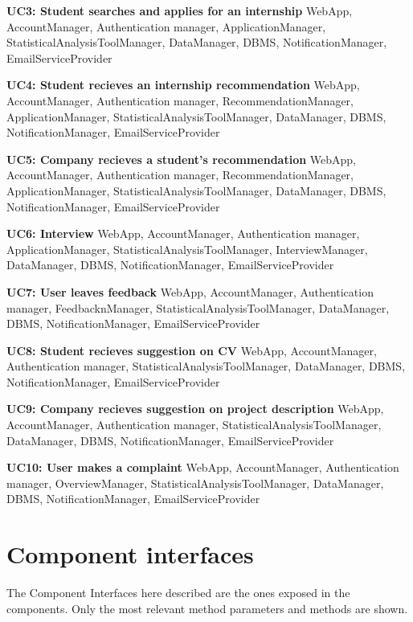 \textbf{UC3: Student searches and applies for an internship}
WebApp, AccountManager, Authentication manager, ApplicationManager, StatisticalAnalysisToolManager, DataManager, DBMS, NotificationManager, EmailServiceProvider

\textbf{UC4: Student recieves an internship recommendation}
WebApp, AccountManager, Authentication manager, RecommendationManager, ApplicationManager, StatisticalAnalysisToolManager, DataManager, DBMS, NotificationManager, EmailServiceProvider

\textbf{UC5: Company recieves a student's recommendation}
WebApp, AccountManager, Authentication manager, RecommendationManager, ApplicationManager, StatisticalAnalysisToolManager, DataManager, DBMS, NotificationManager, EmailServiceProvider

\textbf{UC6: Interview}
WebApp, AccountManager, Authentication manager, ApplicationManager, StatisticalAnalysisToolManager, InterviewManager, DataManager, DBMS, NotificationManager, EmailServiceProvider

\textbf{UC7: User leaves feedback}
WebApp, AccountManager, Authentication manager, FeedbacknManager, StatisticalAnalysisToolManager, DataManager, DBMS, NotificationManager, EmailServiceProvider

\textbf{UC8: Student recieves suggestion on CV}
WebApp, AccountManager, Authentication manager, StatisticalAnalysisToolManager, DataManager, DBMS, NotificationManager, EmailServiceProvider

\textbf{UC9: Company recieves suggestion on project description}
WebApp, AccountManager, Authentication manager, StatisticalAnalysisToolManager, DataManager, DBMS, NotificationManager, EmailServiceProvider

\textbf{UC10: User makes a complaint}
WebApp, AccountManager, Authentication manager, OverviewManager, StatisticalAnalysisToolManager, DataManager, DBMS, NotificationManager, EmailServiceProvider






\section{Component interfaces}
The Component Interfaces here described are the ones exposed in the components. Only the most relevant method parameters and methods
are shown.

